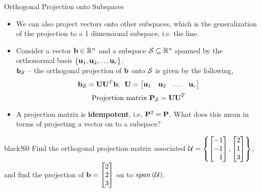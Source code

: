 \documentclass[aspectratio=169]{beamer}
\def\mf{\ensuremath\mathbf}
\def\mb{\ensuremath\mathbb}
\def\mc{\ensuremath\mathcal}
\def\lp{\ensuremath\left(}
\def\rp{\ensuremath\right)}
\newcommand{\demoex}[2]{\onslide<#1->\begin{color}{black!60} #2 \end{color}}
\begin{document}
\begin{frame}[t]{Orthogonal Projection onto Subspaces}
\vspace{-0.2cm}
\begin{small}
\begin{itemize}
    \item We can also project vectors onto other subspaces, which is the generalization of the projection to a 1 dimensional subspace, i.e. the line.
    \item Consider a vector $\mf{b} \in\mb{R}^n$ and a subspace $\mc{S} \subseteq \mb{R}^n$ spanned by the orthonormal basis $\left\{\mf{u}_1, \mf{u}_2, \ldots \mf{u}_r\right\}$.\\
    $\mf{b}_{\mc{S}}$ -- the orthogonal projection of $\mf{b}$ onto $\mc{S}$ is given by the following,
    \[ \mf{b}_{\mc{S}} = \mf{UU}^T\mf{b}; \,\,\, \mf{U} = \begin{bmatrix}\mf{u}_1 & \mf{u}_2 & \ldots & \mf{u}_r \end{bmatrix} \]
    \[ \text{Projection matrix } \mf{P}_{\mc{S}} = \mf{UU}^T \]
    \item A projection matrix is \textbf{idempotent}, i.e. $\mf{P}^2 = \mf{P}$. What does this mean in terms of projecting a vector on to a subspace?
\end{itemize}

\demoex{2}{
Find the orthogonal projection matrix associated $\mc{U} = \left\{\begin{bmatrix*}[r]-1\\-1\\1\end{bmatrix*}, \begin{bmatrix*}[r]2\\1\\3\end{bmatrix*}\right\}$, and find the projection of $\mf{b} = \begin{bmatrix*}[r]2\\2\\3\end{bmatrix*}$ on to $span \lp \mc{U}\rp$.
}
\end{small}
\end{frame}
\end{document}

